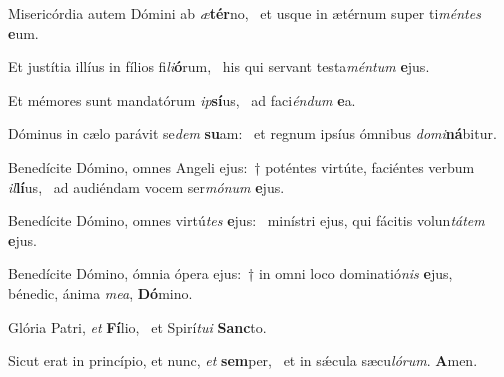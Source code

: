 \item Misericórdia autem Dómini ab \textit{æ}\textbf{tér}no,~\psstar{} et usque in ætérnum super ti\textit{méntes} \textbf{e}um.
\item Et justítia illíus in fílios fi\textit{li}\textbf{ó}rum,~\psstar{} his qui servant testa\textit{méntum} \textbf{e}jus.
\item Et mémores sunt mandatórum \textit{ip}\textbf{sí}us,~\psstar{} ad faci\textit{éndum} \textbf{e}a.
\item Dóminus in cælo parávit se\textit{dem} \textbf{su}am:~\psstar{} et regnum ipsíus ómnibus \textit{domi}\textbf{ná}bitur.
\item Benedícite Dómino, omnes Angeli ejus:~† poténtes virtúte, faciéntes verbum \textit{il}\textbf{lí}us,~\psstar{} ad audiéndam vocem ser\textit{mónum} \textbf{e}jus.
\item Benedícite Dómino, omnes virtú\textit{tes} \textbf{e}jus:~\psstar{} minístri ejus, qui fácitis volun\textit{tátem} \textbf{e}jus.
\item Benedícite Dómino, ómnia ópera ejus:~† in omni loco dominatió\textit{nis} \textbf{e}jus,~\psstar{} bénedic, ánima \textit{mea}, \textbf{Dó}mino.
\item Glória Patri, \textit{et} \textbf{Fí}lio,~\psstar{} et Spirí\textit{tui} \textbf{Sanc}to.
\item Sicut erat in princípio, et nunc, \textit{et} \textbf{sem}per,~\psstar{} et in sǽcula sæcu\textit{lórum}. \textbf{A}men.